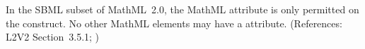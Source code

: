 In the SBML subset of MathML~2.0, the MathML attribute
 is only permitted on the  construct.
No other MathML elements may have a  attribute.
(References: L2V2 Section~3.5.1; )
